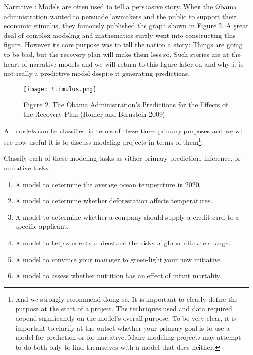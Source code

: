 \documentclass[]{memoir}
\makeatletter
\def\maxwidth{\ifdim\Gin@nat@width>\linewidth\linewidth
\else\Gin@nat@width\fi}
\let\Oldincludegraphics\includegraphics
\renewcommand{\includegraphics}[1]{\Oldincludegraphics[width=\maxwidth]{#1}}
\makeatother
\begin{document}
Narrative : Models are often used to tell a persuasive story. When the
Obama administration wanted to persuade lawmakers and the public to
support their economic stimulus, they famously published the graph shown
in Figure 2. A great deal of complex modeling and mathematics surely
went into constructing this figure. However its core purpose was to tell
the nation a story: Things are going to be bad, but the recovery plan
will make them less so. Such stories are at the heart of narrative
models and we will return to this figure later on and why it is not
really a predictive model despite it generating predictions.

\begin{figure}[htbp]
\centering
\texttt{[image: Stimulus.png]}
\caption{Figure 2. The Obama Administration's Predictions for the
Effects of the Recovery Plan (Romer and Bernstein 2009)}
\end{figure}

All models can be classified in terms of these three primary purposes
and we will see how useful it is to discuss modeling projects in terms
of them\footnote{And we strongly recommend doing so. It is important to
  clearly define the purpose at the start of a project. The techniques
  used and data required depend significantly on the model's overall
  purpose. To be very clear, it is important to clarify at the outset
  whether your primary goal is to use a model for prediction or for
  narrative. Many modeling projects may attempt to do both only to find
  themselves with a model that does neither.}.


Classify each of these modeling tasks as either primary prediction,
inference, or narrative tasks:

\begin{enumerate}
\def\labelenumi{\arabic{enumi}.}
\itemsep1pt\parskip0pt
\item
  A model to determine the average ocean temperature in 2020.
\item
  A model to determine whether deforestation affects temperatures.
\item
  A model to determine whether a company should supply a credit card to
  a specific applicant.
\item
  A model to help students understand the risks of global climate
  change.
\item
  A model to convince your manager to green-light your new initiative.
\item
  A model to assess whether nutrition has an effect of infant mortality.
\end{enumerate}
\end{document}

